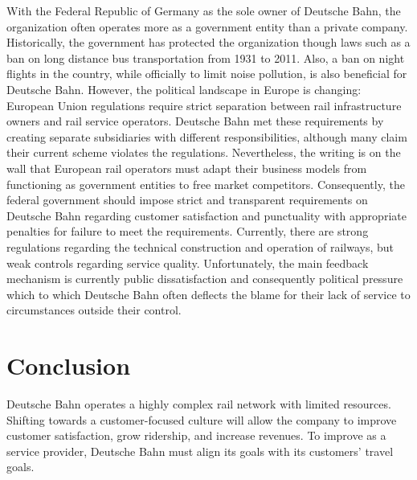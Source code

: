 \documentclass{article}
\begin{document}
With the Federal Republic of Germany as the sole owner of Deutsche Bahn, the organization often operates more as a government entity than a private company. Historically, the government has protected the organization though laws such as a ban on long distance bus transportation from 1931 to 2011. Also, a ban on night flights in the country, while officially to limit noise pollution, is also beneficial for Deutsche Bahn. However, the political landscape in Europe is changing: European Union regulations require strict separation between rail infrastructure owners and rail service operators. Deutsche Bahn met these requirements by creating separate subsidiaries with different responsibilities, although many claim their current scheme violates the regulations. Nevertheless, the writing is on the wall that European rail operators must adapt their business models from functioning as government entities to free market competitors. Consequently, the federal government should impose strict and transparent requirements on Deutsche Bahn regarding customer satisfaction and punctuality with appropriate penalties for failure to meet the requirements. Currently, there are strong regulations regarding the technical construction and operation of railways, but weak controls regarding service quality. Unfortunately, the main feedback mechanism is currently public dissatisfaction and consequently political pressure which to which Deutsche Bahn often deflects the blame for their lack of service to circumstances outside their control.

\section{Conclusion}
Deutsche Bahn operates a highly complex rail network with limited resources. Shifting towards a customer-focused culture will allow the company to improve customer satisfaction, grow ridership, and increase revenues. To improve as a service provider, Deutsche Bahn must align its goals with its customers' travel goals.


\end{document}
